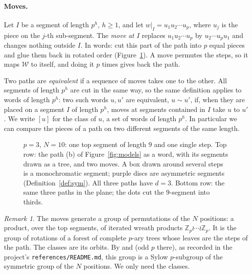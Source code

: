 \documentclass[11pt]{article}
\theoremstyle{definition}
\theoremstyle{remark}
\newtheorem{remark}[theorem]{Remark}
\newcommand{\W}{\mathcal{W}}
\begin{document}
\paragraph{Moves.} Let $I$ be a segment of length $p^h$, $h\ge 1$, and let $w|_I=u_1u_2\cdots u_p$, where $u_j$
is the piece on the $j$-th sub-segment. The \emph{move at $I$} replaces $u_1u_2\cdots u_p$ by $u_2\cdots u_pu_1$ and
changes nothing outside $I$. In words: cut this part of the path into $p$ equal pieces and glue them back in
rotated order (Figure~\ref{fig:moves}). A move permutes the steps, so it maps $\W$ to itself, and doing it $p$ times
gives back the path.

Two paths are \emph{equivalent} if a sequence of moves takes one to the other. All segments of length $p^h$ are
cut in the same way, so the same definition applies to words of length $p^h$: two such words $u,u'$ are
equivalent, $u\sim u'$, if, when they are placed on a segment $I$ of length $p^h$, moves at segments contained in $I$
take $u$ to $u'$. We write $[u]$ for the class of $u$, a set of words of length $p^h$. In particular we can
compare the pieces of a path on two different segments of the same length.

\begin{figure}[ht]
\centering
\begin{tikzpicture}

\end{tikzpicture}
\caption{$p=3$, $N=10$: one top segment of length $9$ and one single step. Top row: the path (b) of
Figure~\ref{fig:models} as a word, with its segments drawn as a tree, and two moves. A box drawn around several steps
is a monochromatic segment; purple discs are asymmetric segments (Definition~\ref{def:sym}). All three paths have
$d=3$. Bottom row: the same three paths in the plane; the dots cut the $9$-segment into thirds.}
\label{fig:moves}
\end{figure}

\begin{remark}
The moves generate a group of permutations of the $N$ positions: a product, over the top segments, of
iterated wreath products $\mathbb Z_p\wr\cdots\wr\mathbb Z_p$. It is the group of rotations of a forest of complete $p$-ary
trees whose leaves are the steps of the path. The classes are its orbits. By \cite[p.~239]{Kal} and
\cite[Section~2]{GL} (odd $p$ there), as recorded in the project's \texttt{references/README.md}, this group is a Sylow
$p$-subgroup of the symmetric group of the $N$ positions. We only need the classes.
\end{remark}
\end{document}
